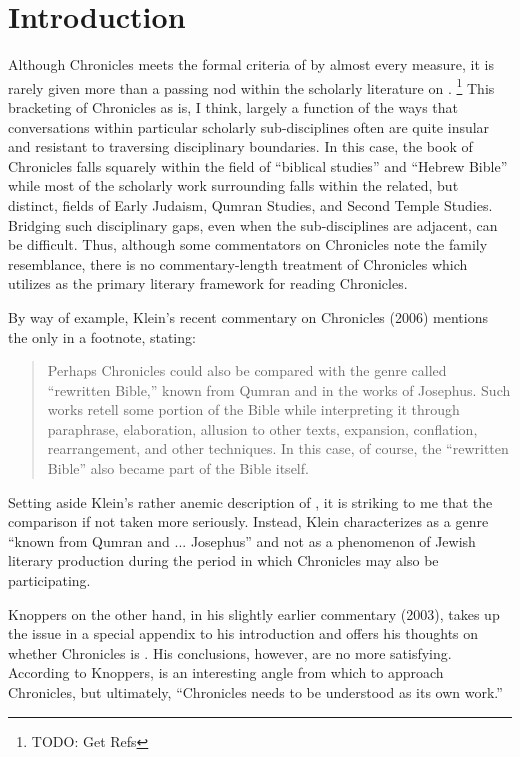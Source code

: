 \section{Introduction}

Although Chronicles meets the formal criteria of \rwb by almost every measure, it is rarely given more than a passing nod within the scholarly literature on \rwb.%
    \footnote{TODO: Get Refs}
This bracketing of Chronicles as \rwb is, I think, largely a function of the ways that conversations within particular scholarly sub-disciplines often are quite insular and resistant to traversing disciplinary boundaries. In this case, the book of Chronicles falls squarely within the field of ``biblical studies'' and ``Hebrew Bible'' while most of the scholarly work surrounding \rwb falls within the related, but distinct, fields of Early Judaism, Qumran Studies, and Second Temple Studies. Bridging such disciplinary gaps, even when the sub-disciplines are adjacent, can be difficult. Thus, although some commentators on Chronicles note the family resemblance, there is no commentary-length treatment of Chronicles which utilizes \rwb as the primary literary framework for reading Chronicles.

By way of example, Klein's recent commentary on Chronicles (2006) mentions the \rwb only in a footnote, stating:

\begin{quote}
    Perhaps Chronicles could also be compared with the genre called ``rewritten Bible,'' known from Qumran and in the works of Josephus. Such works retell some portion of the Bible while interpreting it through paraphrase, elaboration, allusion to other texts, expansion, conflation, rearrangement, and other techniques. In this case, of course, the ``rewritten Bible'' also became part of the Bible itself.\autocite[17 n.157]{klein2006}
\end{quote}

Setting aside Klein's rather anemic description of \rwb, it is striking to me that the comparison if not taken more seriously. Instead, Klein characterizes \rwb as a genre ``known from Qumran and ... Josephus'' and not as a phenomenon of Jewish literary production during the \secondtemple period in which Chronicles may also be participating.

Knoppers on the other hand, in his slightly earlier commentary (2003), takes up the issue in a special appendix to his introduction and offers his thoughts on whether Chronicles is \rwb.\autocite[129--134]{knoppers2003} His conclusions, however, are no more satisfying. According to Knoppers, \rwb is an interesting angle from which to approach Chronicles, but ultimately, ``Chronicles needs to be understood as its own work.''\autocite[134]{knoppers2003}